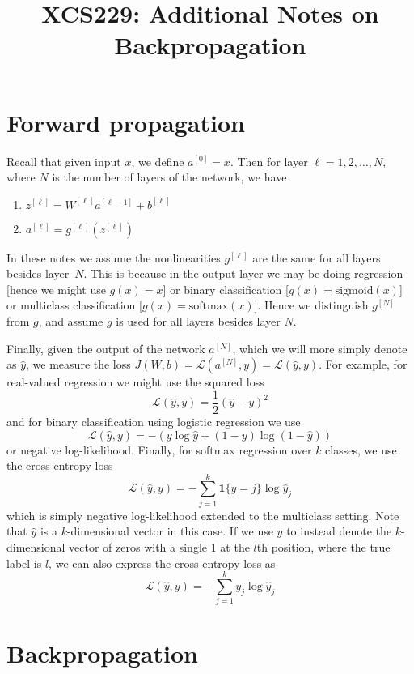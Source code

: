 \documentclass{article}
\numberwithin{equation}{section}
\begin{document}
\title{XCS229: Additional Notes on Backpropagation}
\date{}
\maketitle

\section{Forward propagation}

Recall that given input $x$, we define $a^{[0]} = x$.
Then for layer $\ell = 1,2,\dots,N$, where $N$ is the number of layers of
the network, we have
\begin{enumerate}
  \item $z^{[\ell]} = W^{[\ell]} a^{[\ell-1]} + b^{[\ell]}$
  \item $a^{[\ell]} = g^{[\ell]}(z^{[\ell]})$
\end{enumerate}
In these notes we assume the nonlinearities $g^{[\ell]}$ are the same for all layers
besides layer~$N$. This is because in the output layer we may be doing
regression [hence we might use $g(x) = x$] or binary classification
[$g(x) = \text{sigmoid}(x)$] or multiclass classification [$g(x) = \text{softmax}(x)$].
Hence we distinguish $g^{[N]}$ from $g$, and assume $g$ is used for all layers besides layer $N$.

Finally, given the output of the network $a^{[N]}$, which we will more simply denote as
$\hat{y}$, we measure the loss
$J(W, b) = \mathcal{L}(a^{[N]}, y) = \mathcal{L}(\hat{y}, y)$. For example, for real-valued regression we might use
the squared loss
$$\mathcal{L}(\hat{y}, y) = \frac{1}{2}(\hat{y} - y)^2$$
and for binary classification using logistic regression we use
$$\mathcal{L}(\hat{y}, y) = -(y \log \hat{y} + (1-y) \log(1-\hat{y}))$$
or negative log-likelihood. Finally, for softmax regression over $k$ classes, we use
the cross entropy loss
$$\mathcal{L}(\hat{y}, y) = -\sum_{j=1}^k \mathbf{1}\{y=j\} \log \hat{y}_j$$
which is simply negative log-likelihood extended to the multiclass setting.
Note that $\hat{y}$ is a $k$-dimensional vector in this case.
If we use $y$ to instead denote the $k$-dimensional vector of zeros with
a single $1$ at the $l$th position, where the true label is $l$, we can also
express the cross entropy loss as
$$\mathcal{L}(\hat{y}, y) = -\sum_{j=1}^k y_j \log \hat{y}_j$$

\section{Backpropagation}
\end{document}
